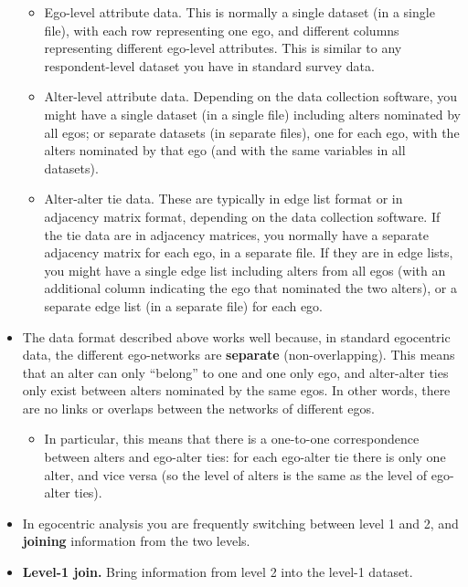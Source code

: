\documentclass[
]{book}
\providecommand{\tightlist}{%
  \setlength{\itemsep}{0pt}\setlength{\parskip}{0pt}}
\begin{document}
\begin{itemize}
  \begin{itemize}
  \tightlist
  \item
    Ego-level attribute data. This is normally a single dataset (in a single file), with each row representing one ego, and different columns representing different ego-level attributes. This is similar to any respondent-level dataset you have in standard survey data.
  \item
    Alter-level attribute data. Depending on the data collection software, you might have a single dataset (in a single file) including alters nominated by all egos; or separate datasets (in separate files), one for each ego, with the alters nominated by that ego (and with the same variables in all datasets).
  \item
    Alter-alter tie data. These are typically in edge list format or in adjacency matrix format, depending on the data collection software. If the tie data are in adjacency matrices, you normally have a separate adjacency matrix for each ego, in a separate file. If they are in edge lists, you might have a single edge list including alters from all egos (with an additional column indicating the ego that nominated the two alters), or a separate edge list (in a separate file) for each ego.
  \end{itemize}
\item
  The data format described above works well because, in standard egocentric data, the different ego-networks are \textbf{separate} (non-overlapping). This means that an alter can only ``belong'' to one and one only ego, and alter-alter ties only exist between alters nominated by the same egos. In other words, there are no links or overlaps between the networks of different egos.

  \begin{itemize}
  \tightlist
  \item
    In particular, this means that there is a one-to-one correspondence between alters and ego-alter ties: for each ego-alter tie there is only one alter, and vice versa (so the level of alters is the same as the level of ego-alter ties).
  \end{itemize}
\item
  In egocentric analysis you are frequently switching between level 1 and 2, and \textbf{joining} information from the two levels.
\item
  \textbf{Level-1 join.} Bring information from level 2 into the level-1 dataset.


\end{itemize}
\end{document}
